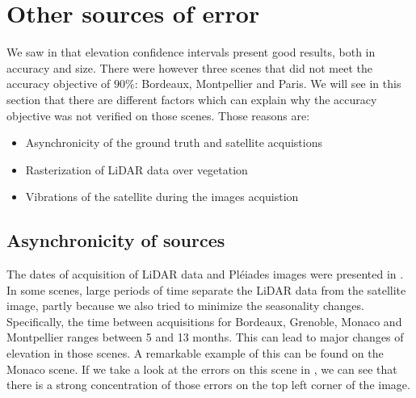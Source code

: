 \section{Other sources of error}\label{sec:other_errors}
We saw in  that elevation confidence intervals present good results, both in accuracy and size. There were however three scenes that did not meet the accuracy objective of $90\%$: Bordeaux, Montpellier and Paris. We will see in this section that there are different factors which can explain why the accuracy objective was not verified on those scenes. Those reasons are: 
\begin{itemize}
    \item Asynchronicity of the ground truth and satellite acquistions
    \item Rasterization of LiDAR data over vegetation
    \item Vibrations of the satellite during the images acquistion
\end{itemize}

\subsection{Asynchronicity of sources}
The dates of acquisition of LiDAR data and Pléiades images were presented in . In some scenes, large periods of time separate the LiDAR data from the satellite image, partly because we also tried to minimize the seasonality changes. Specifically, the time between acquisitions for Bordeaux, Grenoble, Monaco and Montpellier ranges between 5 and 13 months. This can lead to major changes of elevation in those scenes. A remarkable example of this can be found on the Monaco scene. If we take a look at the errors on this scene in , we can see that there is a strong concentration of those errors on the top left corner of the image. 

